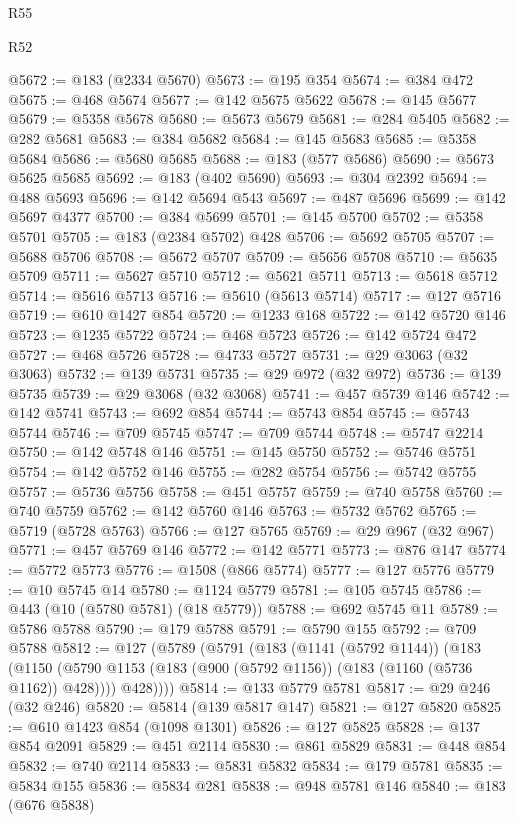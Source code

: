 \begin{lexlean}{R55}
\begin{lexlean}{R52}
\begin{coremodule}
{{{{{{{{{{{{{{{{{{{{{{{{{{{{{{{{{{{{{{{{{{{{{{{{{{{{{{{{{{{{{{{{{{{{{{{{{{{{{{{{{{{{{{{{{{{{{{{{{{{{{{{{{{{{{{{{{{{{{{{{{{{{{{{{{{{{{{{{{{{{{{{{{{{{{{{{{{{{{{{{{{{{{{{{{{{{{{{{{{{{{{{{{{{{{{{{{{{{{{@5672 := @183 (@2334 @5670)
@5673 := @195 @354
@5674 := @384 @472
@5675 := @468 @5674
@5677 := @142 @5675 @5622
@5678 := @145 @5677
@5679 := @5358 @5678
@5680 := @5673 @5679
@5681 := @284 @5405
@5682 := @282 @5681
@5683 := @384 @5682
@5684 := @145 @5683
@5685 := @5358 @5684
@5686 := @5680 @5685
@5688 := @183 (@577 @5686)
@5690 := @5673 @5625 @5685
@5692 := @183 (@402 @5690)
@5693 := @304 @2392
@5694 := @488 @5693
@5696 := @142 @5694 @543
@5697 := @487 @5696
@5699 := @142 @5697 @4377
@5700 := @384 @5699
@5701 := @145 @5700
@5702 := @5358 @5701
@5705 := @183 (@2384 @5702) @428
@5706 := @5692 @5705
@5707 := @5688 @5706
@5708 := @5672 @5707
@5709 := @5656 @5708
@5710 := @5635 @5709
@5711 := @5627 @5710
@5712 := @5621 @5711
@5713 := @5618 @5712
@5714 := @5616 @5713
@5716 := @5610 (@5613 @5714)
@5717 := @127 @5716
@5719 := @610 @1427 @854
@5720 := @1233 @168
@5722 := @142 @5720 @146
@5723 := @1235 @5722
@5724 := @468 @5723
@5726 := @142 @5724 @472
@5727 := @468 @5726
@5728 := @4733 @5727
@5731 := @29 @3063 (@32 @3063)
@5732 := @139 @5731
@5735 := @29 @972 (@32 @972)
@5736 := @139 @5735
@5739 := @29 @3068 (@32 @3068)
@5741 := @457 @5739 @146
@5742 := @142 @5741
@5743 := @692 @854
@5744 := @5743 @854
@5745 := @5743 @5744
@5746 := @709 @5745
@5747 := @709 @5744
@5748 := @5747 @2214
@5750 := @142 @5748 @146
@5751 := @145 @5750
@5752 := @5746 @5751
@5754 := @142 @5752 @146
@5755 := @282 @5754
@5756 := @5742 @5755
@5757 := @5736 @5756
@5758 := @451 @5757
@5759 := @740 @5758
@5760 := @740 @5759
@5762 := @142 @5760 @146
@5763 := @5732 @5762
@5765 := @5719 (@5728 @5763)
@5766 := @127 @5765
@5769 := @29 @967 (@32 @967)
@5771 := @457 @5769 @146
@5772 := @142 @5771
@5773 := @876 @147
@5774 := @5772 @5773
@5776 := @1508 (@866 @5774)
@5777 := @127 @5776
@5779 := @10 @5745 @14
@5780 := @1124 @5779
@5781 := @105 @5745
@5786 := @443 (@10 (@5780 @5781) (@18 @5779))
@5788 := @692 @5745 @11
@5789 := @5786 @5788
@5790 := @179 @5788
@5791 := @5790 @155
@5792 := @709 @5788
@5812 := @127
    (@5789
      (@5791
        (@183
          (@1141 (@5792 @1144))
          (@183
            (@1150 (@5790 @1153 (@183 (@900 (@5792 @1156)) (@183 (@1160 (@5736 @1162)) @428))))
            @428))))
@5814 := @133 @5779 @5781
@5817 := @29 @246 (@32 @246)
@5820 := @5814 (@139 @5817 @147)
@5821 := @127 @5820
@5825 := @610 @1423 @854 (@1098 @1301)
@5826 := @127 @5825
@5828 := @137 @854 @2091
@5829 := @451 @2114
@5830 := @861 @5829
@5831 := @448 @854
@5832 := @740 @2114
@5833 := @5831 @5832
@5834 := @179 @5781
@5835 := @5834 @155
@5836 := @5834 @281
@5838 := @948 @5781 @146
@5840 := @183 (@676 @5838)
}}}}}}}}}}}}}}}}}}}}}}}}}}}}}}}}}}}}}}}}}}}}}}}}}}}}}}}}}}}}}}}}}}}}}}}}}}}}}}}}}}}}}}}}}}}}}}}}}}}}}}}}}}}}}}}}}}}}}}}}}}}}}}}}}}}}}}}}}}}}}}}}}}}}}}}}}}}}}}}}}}}}}}}}}}}}}}}}}}}}}}}}}}}}}}}}}}}}}}
\end{coremodule}
\end{lexlean}
\end{lexlean}
